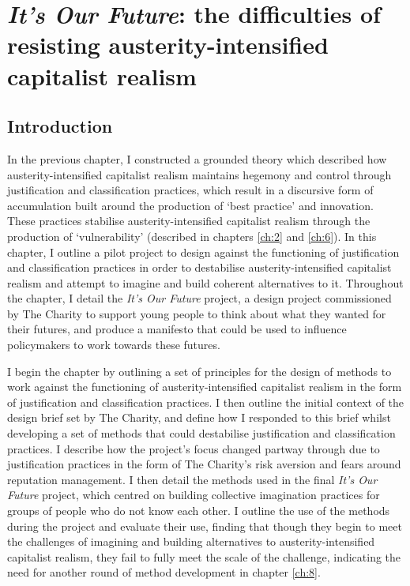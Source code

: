 \chapter{\textit{It's Our Future}: the difficulties of resisting austerity-intensified capitalist realism}
\label{ch:7}

\section{Introduction}
\label{sec: 7-intro}

In the previous chapter, I constructed a grounded theory which described how austerity-intensified capitalist realism maintains hegemony and control through justification and classification practices, which result in a discursive form of accumulation built around the production of `best practice' and innovation. These practices stabilise austerity-intensified capitalist realism through the production of `vulnerability' (described in chapters \ref{ch:2} and \ref{ch:6}). In this chapter, I outline a pilot project to design against the functioning of justification and classification practices in order to destabilise austerity-intensified capitalist realism and attempt to imagine and build coherent alternatives to it. Throughout the chapter, I detail the \emph{It's Our Future} project, a design project commissioned by The Charity to support young people to think about what they wanted for their futures, and produce a manifesto that could be used to influence policymakers to work towards these futures.

I begin the chapter by outlining a set of principles for the design of methods to work against the functioning of austerity-intensified capitalist realism in the form of justification and classification practices. I then outline the initial context of the design brief set by The Charity, and define how I responded to this brief whilst developing a set of methods that could destabilise justification and classification practices. I describe how the project's focus changed partway through due to justification practices in the form of The Charity's risk aversion and fears around reputation management. I then detail the methods used in the final \emph{It's Our Future} project, which centred on building collective imagination practices for groups of people who do not know each other. I outline the use of the methods during the project and evaluate their use, finding that though they begin to meet the challenges of imagining and building alternatives to austerity-intensified capitalist realism, they fail to fully meet the scale of the challenge, indicating the need for another round of method development in chapter \ref{ch:8}. 

